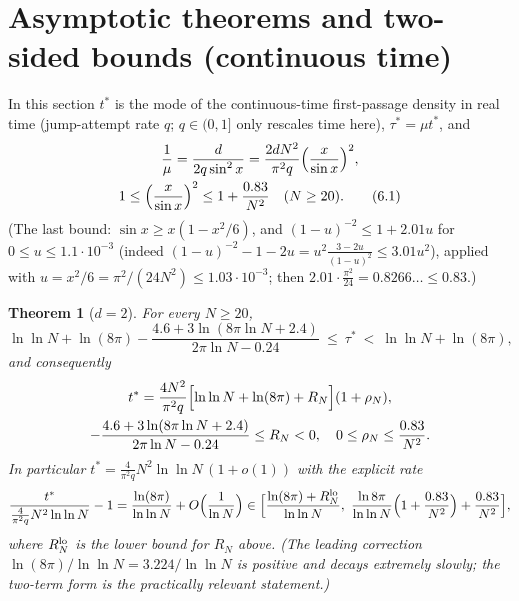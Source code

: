 \documentclass[11pt,a4paper]{article}
\newtheorem{theorem}{Theorem}[section]
\theoremstyle{definition}
\theoremstyle{remark}
\begin{document}
\setcounter{section}{5}
\section{Asymptotic theorems and two-sided bounds (continuous time)}

In this section $t^*$ is the mode of the continuous-time first-passage density in real time (jump-attempt rate $q$; $q\in(0,1]$ only rescales time here), $\tau^*=\mu t^*$, and
\begin{gather*}
\frac1\mu=\frac{d}{2q\sin^2x}=\frac{2dN^2}{\pi^2q}\Bigl(\frac{x}{\sin x}\Bigr)^2, \\
1\le\Bigl(\frac x{\sin x}\Bigr)^2\le1+\frac{0.83}{N^2}\quad(N\ge20). \tag{6.1}
\end{gather*}
(The last bound: $\sin x\ge x(1-x^2/6)$, and $(1-u)^{-2}\le1+2.01u$ for $0\le u\le1.1\cdot10^{-3}$ (indeed $(1-u)^{-2}-1-2u=u^2\frac{3-2u}{(1-u)^2}\le3.01u^2$), applied with $u=x^2/6=\pi^2/(24N^2)\le1.03\cdot10^{-3}$; then $2.01\cdot\frac{\pi^2}{24}=0.8266\ldots\le0.83$.)

\begin{theorem}[{$d=2$}]
For every $N\ge20$,
\begin{equation*}
\ln\ln N+\ln(8\pi)-\frac{4.6+3\ln(8\pi\ln N+2.4)}{2\pi\ln N-0.24}\ \le\ \tau^*\ <\ \ln\ln N+\ln(8\pi),
\end{equation*}
and consequently
\begin{gather*}
t^*=\frac{4N^2}{\pi^2q}\Bigl[\ln\ln N+\ln(8\pi)+R_N\Bigr](1+\rho_N), \\
-\frac{4.6+3\ln(8\pi\ln N+2.4)}{2\pi\ln N-0.24}\le R_N<0,\quad 0\le\rho_N\le\frac{0.83}{N^2}.
\end{gather*}
In particular $t^*=\frac{4}{\pi^2q}N^2\ln\ln N\,(1+o(1))$ with the explicit rate
\begin{equation*}
\frac{t^*}{\frac{4}{\pi^2q}N^2\ln\ln N}-1=\frac{\ln(8\pi)}{\ln\ln N}+O\Bigl(\frac{1}{\ln N}\Bigr)\in\Bigl[\frac{\ln(8\pi)+R^{\rm lo}_N}{\ln\ln N},\ \frac{\ln 8\pi}{\ln\ln N}\Bigl(1+\frac{0.83}{N^2}\Bigr)+\frac{0.83}{N^2}\Bigr],
\end{equation*}
where $R_N^{\rm lo}$ is the lower bound for $R_N$ above. (The leading correction $\ln(8\pi)/\ln\ln N=3.224/\ln\ln N$ is positive and decays extremely slowly; the two-term form is the practically relevant statement.)
\end{theorem}
\end{document}
